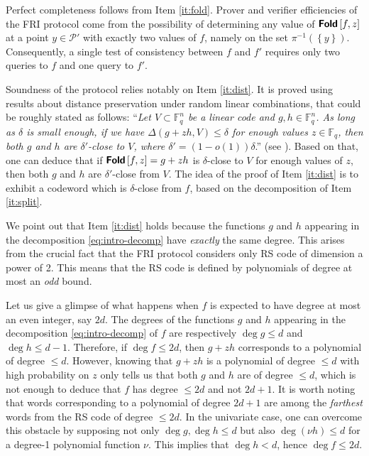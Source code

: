 \documentclass[a4paper,USenglish,autoref]{lipics-v2021}
\newcommand\Fq{\mathbb{F}_q}
\newcommand\fold[1]{\textsf{\textbf{Fold}}\left[#1\right]}
\newcommand{\set}[1]{\left\{#1\right\}}
\newcommand\calP{\mathcal{P}}
\begin{document}
Perfect completeness follows from Item \ref{it:fold}. Prover and verifier efficiencies of the \textsf{FRI} protocol come from the possibility of determining any value of $\fold{f,z}$ at a point $y \in \calP'$ with exactly two values of $f$, namely on the set $\pi^{-1}(\set{y})$. Consequently, a single test of consistency between $f$ and $f'$ requires only two queries to $f$ and one query to $f'$.

Soundness of the protocol relies notably on Item \ref{it:dist}. It is proved using results about distance preservation under random linear combinations, that could be roughly stated as follows:
``\emph{Let $V \subset \Fq^{n}$ be a linear code and $g, h \in \Fq^n$. As long as $\delta$ is small enough, if we have $\Delta(g + z h, V) \le \delta$ for enough values $z \in \Fq$, then both $g$ and $h$ are $\delta'$-close to $V$, where $\delta' = (1 - o(1))\delta$}.'' (see \cite{BBHR18a, BKS18, BGKS20, BCIKS20}). Based on that, one can deduce that if $\fold{f, z} = g + zh$ is $\delta$-close to $V$ for enough values of $z$, then both $g$ and $h$ are $\delta'$-close from $V$. The idea of the proof of Item \ref{it:dist} is to exhibit a codeword which is $\delta$-close from $f$, based on the decomposition of Item \ref{it:split}. 

\begin{remark}\label{rmk:even-RS}
	We point out that Item \ref{it:dist} holds because the functions $g$ and $h$ appearing in the decomposition \eqref{eq:intro-decomp} have \emph{exactly} the same degree. This arises from the crucial fact that the \textsf{FRI} protocol considers only RS code of dimension a power of 2. This means that the RS code is defined by polynomials of degree at most an \emph{odd} bound.
	
	Let us give a glimpse of what happens when $f$ is expected to have degree at most an even integer, say $2d$. The degrees of the functions $g$ and $h$ appearing in the decomposition \eqref{eq:intro-decomp} of $f$ are respectively $\deg g \le d$ and $\deg h \le d-1$. 
	Therefore, if $\deg f \le 2d$, then $g + z h$ corresponds to a polynomial of degree $\le d$. However, knowing that $g + z h$ is a polynomial of degree $\le d$ with high probability on $z$ only tells us that both $g$ and $h$ are of degree $\le d$, which is not enough to deduce that $f$ has degree $\le 2d$ and not $2d + 1$. 
	It is worth noting that words corresponding to a polynomial of degree $2d+1$ are among the \emph{farthest} words from the RS code of degree $\le 2d$.       
	In the univariate case, one can overcome this obstacle by supposing not only $\deg g,\deg h \leq d$ but also $\deg (\nu h) \le d$ for a degree-1 polynomial function $\nu$. This implies that $\deg h < d$, hence $\deg f \leq 2d$.
\end{remark}
\end{document}
